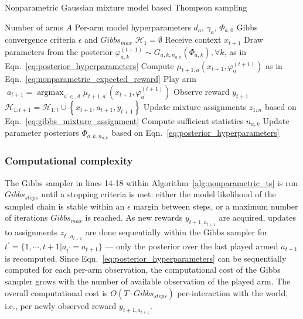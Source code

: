 \documentclass{article}
\newcommand{\A}{\mathcal{A}}
\newcommand{\HH}{\mathcal{H}}
\newcommand{\ie}{i.e., }
\newcommand{\argmax}{\mathop{\mathrm{argmax}}}
\begin{document}
\begin{algorithm}
	\caption{Nonparametric Gaussian mixture model based Thompson sampling}
	\label{alg:nonparametric_ts}
	\begin{algorithmic}[1]
		 Number of arms $A$
		 Per-arm model hyperparameters $d_a$, $\gamma_a$, $\varPhi_{a,0}$
		 Gibbs convergence criteria $\epsilon$ and $Gibbs_{max}$ 
		\STATE $\HH_1=\emptyset$
		\STATE Receive context $x_{t+1}$
		\STATE Draw parameters from the posterior $\varphi_{a,k}^{(t+1)} \sim G_{a,k,n_{a,k}}(\varPhi_{a,k}), \forall k$, as in Eqn.~\eqref{eq:posterior_hyperparameters}
		\STATE Compute $\mu_{t+1,a}(x_{t+1},\varphi_{a}^{(t+1)})$ as in Eqn.~\eqref{eq:nonparametric_expected_reward}
		\ENDFOR
		\STATE Play arm $\; a_{t+1}=\argmax_{a^\prime \in \A} \mu_{t+1,a^\prime}(x_{t+1},\varphi_{a^\prime}^{(t+1)})$
		\STATE Observe reward $y_{t+1}$
		\STATE $\HH_{1:t+1}=\HH_{1:t} \cup \left\{x_{t+1}, a_{t+1}, y_{t+1}\right\}$
		\STATE Update mixture assignments $z_{1:n}$ based on Eqn.~\eqref{eq:gibbs_mixture_assignment}
		\STATE Compute sufficient statistics $n_{a,k}$
		\STATE Update parameter posteriors $\varPhi_{a,k,n_{a,k}}$ based on Eqn.~\eqref{eq:posterior_hyperparameters}
		\ENDWHILE
		\ENDFOR
	\end{algorithmic}
\end{algorithm}

\subsubsection{Computational complexity}
\label{sssec:nonparametric_thompson_sampling_computational_complexity}
The Gibbs sampler in lines 14-18 within Algorithm~\ref{alg:nonparametric_ts} is run $Gibbs_{steps}$ until a stopping criteria is met: either the model likelihood of the sampled chain is stable within an $\epsilon$ margin between steps, or a maximum number of iterations $Gibbs_{max}$ is reached. As new rewards $y_{t+1,a_{t+1}}$ are acquired, updates to assignments $z_{t^\prime,a_{t+1}}$ are done sequentially within the Gibbs sampler for $t^\prime=\{1,\cdots,t+1 | a_{t^\prime}=a_{t+1}\}$ --- only the posterior over the last played armed $a_{t+1}$ is recomputed. Since Eqn.~\eqref{eq:posterior_hyperparameters} can be sequentially computed for each per-arm observation, the computational cost of the Gibbs sampler grows with the number of available observation of the played arm. The overall computational cost is $O(T \cdot Gibbs_{steps})$ per-interaction with the world, \ie per newly observed reward $y_{t+1,a_{t+1}}$.
\end{document}
